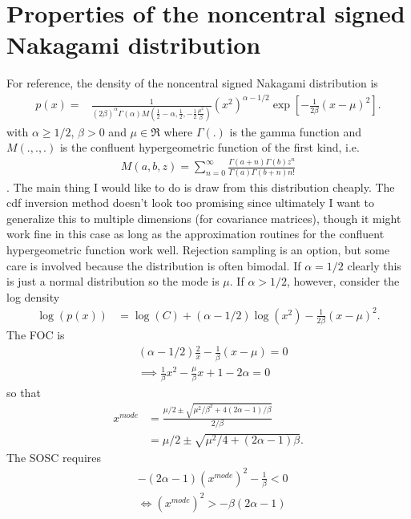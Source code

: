 \documentclass{article}
\begin{document}
\section{Properties of the noncentral signed Nakagami distribution}
For reference, the density of the noncentral signed Nakagami distribution is
\begin{align}\label{dens1}
  p(x)  =& \frac{1}{(2\beta)^{\alpha}\Gamma\left(\alpha\right)M\left(\frac{1}{2}-\alpha,\frac{1}{2},-\frac{1}{2}\frac{\mu^2}{\beta}\right)}(x^2)^{\alpha - 1/2}\exp\left[-\frac{1}{2\beta}(x-\mu)^2\right].
\end{align}
with $\alpha\geq 1/2$, $\beta>0$ and $\mu\in\Re$ where $\Gamma(.)$ is the gamma function and $M(.,.,.)$ is the confluent hypergeometric function of the first kind, i.e.
\begin{align*}
M(a,b,z)=\sum_{n=0}^\infty\frac{\Gamma(a + n)\Gamma(b)z^n}{\Gamma(a)\Gamma(b+n)n!}  
\end{align*}. 
The main thing I would like to do is draw from this distribution cheaply. The cdf inversion method doesn't look too promising since ultimately I want to generalize this to multiple dimensions (for covariance matrices), though it might work fine in this case as long as the approximation routines for the confluent hypergeometric function work well. Rejection sampling is an option, but some care is involved because the distribution is often bimodal. If $\alpha=1/2$ clearly this is just a normal distribution so the mode is $\mu$. If $\alpha > 1/2$, however, consider the log density
\begin{align*}
\log(p(x)) & = \log(C) + (\alpha - 1/2)\log(x^2) - \frac{1}{2\beta}(x-\mu)^2.
\end{align*}
The FOC is
\begin{align*}
&  (\alpha - 1/2)\frac{2}{x} - \frac{1}{\beta}(x-\mu) = 0\\
&\implies \frac{1}{\beta}x^2 - \frac{\mu}{\beta}x + 1 - 2\alpha = 0
\end{align*}
so that
\begin{align*}
  x^{mode} & = \frac{\mu/2 \pm \sqrt{\mu^2/\beta^2 + 4(2\alpha - 1)/\beta}}{2/\beta}\\
    & = \mu/2 \pm \sqrt{\mu^2/4 + (2\alpha -1)\beta}.
\end{align*}
The SOSC requires 
\begin{align*}
  &-(2\alpha - 1)(x^{mode})^2- \frac{1}{\beta} < 0 \\
  &\iff (x^{mode})^2 > -\beta(2\alpha -1)
\end{align*}
\end{document}
